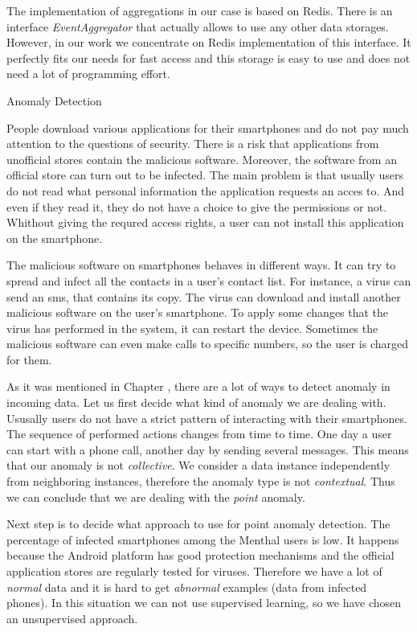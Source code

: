 The implementation of aggregations in our case is based on Redis.
There is an interface \textit{EventAggregator} that actually allows to use any other data storages.
However, in our work we concentrate on Redis implementation of this interface.
It perfectly fits our needs for fast access and this storage is easy to use and does not need a lot of programming effort.


Anomaly Detection

People download various applications for their smartphones and do not pay much attention to the questions of security.
There is a risk that applications from unofficial stores contain the malicious software.
Moreover, the software from an official store can turn out to be infected.
The main problem is that usually users do not read what personal information the application requests an acces to.
And even if they read it, they do not have a choice to give the permissions or not.
Whithout giving the requred access rights, a user can not install this application on the smartphone.
   
The malicious software on smartphones behaves in different ways.
It can try to spread and infect all the contacts in a user's contact list.
For instance, a virus can send an sms, that contains its copy.
The virus can download and install another malicious software on the user's smartphone.
To apply some changes that the virus has performed in the system, it can restart the device.
Sometimes the malicious software can even make calls to specific numbers, so the user is charged for them.

As it was mentioned in Chapter , there are a lot of ways to detect anomaly in incoming data.
Let us first decide what kind of anomaly we are dealing with.
Ususally users do not have a strict pattern of interacting with their smartphones.
The sequence of performed actions changes from time to time.
One day a user can start with a phone call, another day by sending several messages.
This means that our anomaly is not \textit{collective}.
We consider a data instance independently from neighboring instances, therefore the anomaly type is not \textit{contextual}.
Thus we can conclude that we are dealing with the \textit{point} anomaly.

Next step is to decide what approach to use for point anomaly detection.
The percentage of infected smartphones among the Menthal users is low.
It happens because the Android platform has good protection mechanisms and the official application stores are regularly tested for viruses.
Therefore we have a lot of \textit{normal} data and it is hard to get \textit{abnormal} examples (data from infected phones).
In this situation we can not use supervised learning, so we have chosen an unsupervised approach.

